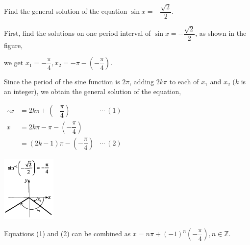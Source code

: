 \documentclass{report}
\begin{document}
\begin{question}
	Find the general solution of the equation $\sin x=-\dfrac{\sqrt{2}}{2}$.
	
	\sol{}
	
	\begin{vwcol}[widths={0.6,0.4}, sep=0.8cm, justify=flush,rule=0pt]
		\noindent First, find the solutions on one period interval of $\sin x=-\dfrac{\sqrt{2}}{2}$, as shown in the figure,
		        
		\noindent we get $x_1=-\dfrac{\pi}{4}, x_2=-\pi-\left(-\dfrac{\pi}{4}\right)$.
		
		\noindent Since the period of the sine function is $2\pi$, adding $2k\pi$ to each of $x_1$ and $x_2$ ($k$ is an integer), we obtain the general solution of the equation,
		
		\vspace{1em}
		\noindent $\begin{aligned} \therefore x & =2 k \pi+\left(-\dfrac{\pi}{4}\right)  &\cdots\ (1)\\ x & =2 k \pi-\pi-\left(-\dfrac{\pi}{4}\right) \\ & =(2 k-1) \pi-\left(-\dfrac{\pi}{4}\right) &\cdots\ (2)\end{aligned}$
		
		\includegraphics[width=0.2\textwidth]{assets/11-10.jpg}
	\end{vwcol}
	\vspace{-1em}
	\noindent Equations (1) and (2) can be combined as $x=n\pi+(-1)^n\left(-\dfrac{\pi}{4}\right), n \in \mathbb{Z}$.
\end{question}
\end{document}
